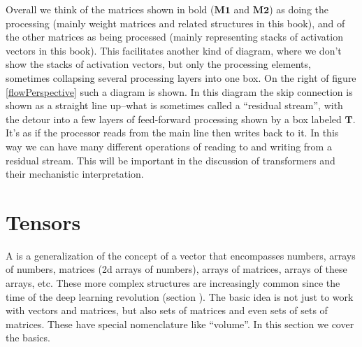 Overall we think of the matrices shown in bold ($\mathbf{M1}$ and $\mathbf{M2}$) as doing the processing (mainly weight matrices and related structures in this book), and of the other matrices as being processed (mainly representing stacks of activation vectors in this book).  This facilitates another kind of diagram, where we don't show the stacks of activation vectors, but only the processing elements, sometimes collapsing several processing layers into one box.  On the right of figure \ref{flowPerspective} such a diagram is shown. In this diagram the skip connection is shown as a straight line up--what is sometimes called a ``residual stream'', with the detour into a few layers of feed-forward processing shown by a box labeled $\mathbf{T}$. It's as if the processor reads from the main line then writes back to it. In this way we can have many different operations of reading to and writing from a residual stream. This will be important in the discussion of transformers and their mechanistic interpretation.

\section{Tensors}\label{sect_tensors}


A  is a generalization of the concept of a vector that encompasses numbers, arrays of numbers, matrices (2d arrays of numbers), arrays of matrices, arrays of these arrays, etc. These more complex structures are increasingly common since the time of the deep learning revolution (section ). The basic idea is not just to work with vectors and matrices, but also sets of matrices and even sets of sets of matrices. These have special nomenclature like ``volume''. In this section we cover the basics.

